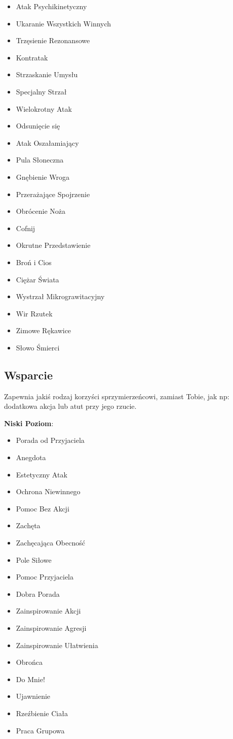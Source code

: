 \begin{itemize}
\item Atak Psychikinetyczny
\item Ukaranie Wszystkich Winnych
\item Trzęsienie Rezonansowe
\item Kontratak
\item Strzaskanie Umysłu
\item Specjalny Strzał
\item Wielokrotny Atak
\item Odsunięcie się
\item Atak Oszałamiający
\item Pula Słoneczna
\item Gnębienie Wroga
\item Przerażające Spojrzenie
\item Obrócenie Noża
\item Cofnij
\item Okrutne Przedstawienie
\item Broń i Cios
\item Ciężar Świata
\item Wystrzał Mikrograwitacyjny
\item Wir Rzutek
\item Zimowe Rękawice
\item Słowo Śmierci
\end{itemize}

\subsection{Wsparcie}

Zapewnia jakiś rodzaj korzyści sprzymierzeńcowi, zamiast Tobie, jak np: dodatkowa akcja lub atut przy jego rzucie. 

\textbf{Niski Poziom}:

\begin{itemize} 
\item Porada od Przyjaciela
\item Anegdota
\item Estetyczny Atak
\item Ochrona Niewinnego
\item Pomoc Bez Akcji
\item Zachęta
\item Zachęcająca Obecność
\item Pole Siłowe
\item Pomoc Przyjaciela
\item Dobra Porada
\item Zainspirowanie Akcji
\item Zainspirowanie Agresji
\item Zainspirowanie Ułatwienia
\item Obrońca
\item Do Mnie!
\item Ujawnienie
\item Rzeźbienie Ciała
\item Praca Grupowa
\end{itemize}

